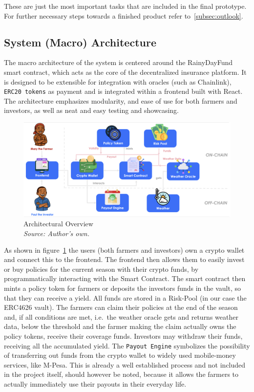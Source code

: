 \documentclass[11pt,a4paper]{article}
\begin{document}
    These are just the most important tasks that are included in the final prototype.
    For further necessary steps towards a finished product refer to~\ref{subsec:outlook}.

    \subsection{System (Macro) Architecture}\label{subsec:system-architecture}
    The macro architecture of the system is centered around the RainyDayFund smart contract, which acts as the core of the decentralized insurance platform.
    It is designed to be extensible for integration with oracles (such as Chainlink), \texttt{ERC20 tokens} as payment and is integrated within a frontend built with React.
    The architecture emphasizes modularity, and ease of use for both farmers and investors, as well as neat and easy testing and showcasing.

    \begin{figure}[H]
        \centering
        \includegraphics[scale=0.3]{graphics/Architectural_Overview}
        \caption{Architectural Overview \\ \textit{Source: Author's own.}}
        \label{fig:architecture}
    \end{figure}

    As shown in figure~\ref{fig:architecture} the users (both farmers and investors) own a crypto wallet and connect this to the frontend.
    The frontend then allows them to easily invest or buy policies for the current season with their crypto funds, by programmatically interacting with the Smart Contract.
    The smart contract then mints a policy token for farmers or deposits the investors funds in the vault, so that they can receive a yield.
    All funds are stored in a Risk-Pool (in our case the ERC4626 vault).
    The farmers can claim their policies at the end of the season and, if all conditions are met, i.e.\ the weather oracle gets and returns weather data, below the threshold and the farmer making the claim actually owns the policy tokens, receive their coverage funds.
    Investors may withdraw their funds, receiving all the accumulated yield.
    The \texttt{Payout Engine} symbolizes the possibility of transferring out funds from the crypto wallet to widely used mobile-money services, like M-Pesa.
    This is already a well established process and not included in the project itself, should however be noted, because it allows the farmers to actually immediately use their payouts in their everyday life.
\end{document}

